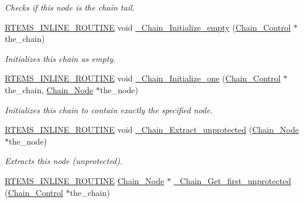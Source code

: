 \begin{DoxyCompactItemize}
\begin{DoxyCompactList}\small\item\em Checks if this node is the chain tail. \end{DoxyCompactList}\item 
\mbox{\hyperlink{group__RTEMSScoreBaseDefs_gac216239df231d5dbd15e3520b0b9313f}{R\+T\+E\+M\+S\+\_\+\+I\+N\+L\+I\+N\+E\+\_\+\+R\+O\+U\+T\+I\+NE}} void \mbox{\hyperlink{group__RTEMSScoreChain_ga322cf50ff1974dab1ce8d60ec94ef5f8}{\+\_\+\+Chain\+\_\+\+Initialize\+\_\+empty}} (\mbox{\hyperlink{unionChain__Control}{Chain\+\_\+\+Control}} $\ast$the\+\_\+chain)
\begin{DoxyCompactList}\small\item\em Initializes this chain as empty. \end{DoxyCompactList}\item 
\mbox{\hyperlink{group__RTEMSScoreBaseDefs_gac216239df231d5dbd15e3520b0b9313f}{R\+T\+E\+M\+S\+\_\+\+I\+N\+L\+I\+N\+E\+\_\+\+R\+O\+U\+T\+I\+NE}} void \mbox{\hyperlink{group__RTEMSScoreChain_ga0517456a542eb18908e2aab467e358fb}{\+\_\+\+Chain\+\_\+\+Initialize\+\_\+one}} (\mbox{\hyperlink{unionChain__Control}{Chain\+\_\+\+Control}} $\ast$the\+\_\+chain, \mbox{\hyperlink{group__RTEMSScoreChain_ga0dd4bfcca1ac7f90de2842e447846d3d}{Chain\+\_\+\+Node}} $\ast$the\+\_\+node)
\begin{DoxyCompactList}\small\item\em Initializes this chain to contain exactly the specified node. \end{DoxyCompactList}\item 
\mbox{\hyperlink{group__RTEMSScoreBaseDefs_gac216239df231d5dbd15e3520b0b9313f}{R\+T\+E\+M\+S\+\_\+\+I\+N\+L\+I\+N\+E\+\_\+\+R\+O\+U\+T\+I\+NE}} void \mbox{\hyperlink{group__RTEMSScoreChain_ga51ca91740b37b6101d1aa80167ddcfe0}{\+\_\+\+Chain\+\_\+\+Extract\+\_\+unprotected}} (\mbox{\hyperlink{group__RTEMSScoreChain_ga0dd4bfcca1ac7f90de2842e447846d3d}{Chain\+\_\+\+Node}} $\ast$the\+\_\+node)
\begin{DoxyCompactList}\small\item\em Extracts this node (unprotected). \end{DoxyCompactList}\item 
\mbox{\hyperlink{group__RTEMSScoreBaseDefs_gac216239df231d5dbd15e3520b0b9313f}{R\+T\+E\+M\+S\+\_\+\+I\+N\+L\+I\+N\+E\+\_\+\+R\+O\+U\+T\+I\+NE}} \mbox{\hyperlink{group__RTEMSScoreChain_ga0dd4bfcca1ac7f90de2842e447846d3d}{Chain\+\_\+\+Node}} $\ast$ \mbox{\hyperlink{group__RTEMSScoreChain_ga1b1dedf23d978ddd9b30b0d1feb6e093}{\+\_\+\+Chain\+\_\+\+Get\+\_\+first\+\_\+unprotected}} (\mbox{\hyperlink{unionChain__Control}{Chain\+\_\+\+Control}} $\ast$the\+\_\+chain)

\end{DoxyCompactItemize}
